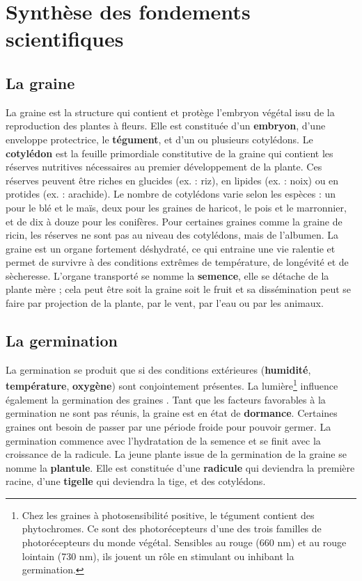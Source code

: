 \section{Synthèse des fondements scientifiques}
\subsection{La graine}
La graine est la structure qui contient et protège l’embryon végétal issu de la reproduction des plantes à fleurs. Elle est constituée d’un \textbf{embryon}, d’une enveloppe protectrice, le \textbf{tégument}, et d’un ou plusieurs cotylédons. Le \textbf{cotylédon} est la feuille primordiale constitutive de la graine qui contient les réserves nutritives nécessaires au premier développement de la plante. Ces réserves peuvent être riches en glucides (ex. : riz), en lipides (ex. : noix) ou en protides (ex. : arachide). Le nombre de cotylédons varie selon les espèces : un pour le blé et le maïs, deux pour les graines de haricot, le pois et le marronnier, et de dix à douze pour les conifères. Pour certaines graines comme la graine de ricin, les réserves ne sont pas au niveau des cotylédons, mais de l’albumen. La graine est un organe fortement déshydraté, ce qui entraine une vie ralentie et permet de survivre à des conditions extrêmes de température, de longévité et de sècheresse. L’organe transporté se nomme la \textbf{semence}, elle se détache de la plante mère ; cela peut être soit la graine soit le fruit et sa dissémination peut se faire par projection de la plante, par le vent, par l’eau ou par les animaux.

\subsection{La germination}
La germination se produit que si des conditions extérieures (\textbf{humidité}, \textbf{température}, \textbf{oxygène}) sont conjointement présentes. La lumière\footnote{Chez les graines à photosensibilité positive, le tégument contient des phytochromes. Ce sont des photorécepteurs d’une des trois familles de photorécepteurs du monde végétal. Sensibles au rouge (660 nm) et au rouge lointain (730 nm), ils jouent un rôle en stimulant ou inhibant la germination.} influence également la germination des graines \cite[p.~374]{Hopkins2003}. %
Tant que les facteurs favorables à la germination ne sont pas réunis, la graine est en état de \textbf{dormance}. Certaines graines ont besoin de passer par une période froide pour pouvoir germer. La germination commence avec l’hydratation de la semence et se finit avec la croissance de la radicule. La jeune plante issue de la germination de la graine se nomme la \textbf{plantule}. Elle est constituée d’une \textbf{radicule} qui deviendra la première racine, d’une \textbf{tigelle} qui deviendra la tige, et des cotylédons.


